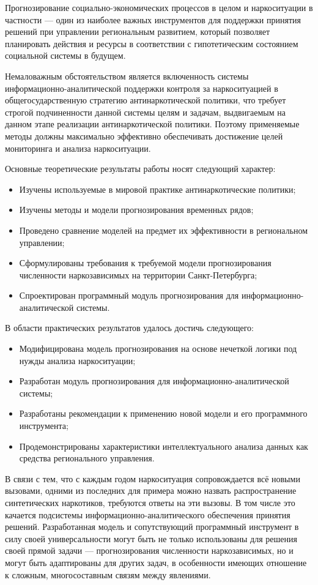 Прогнозирование социально-экономических процессов в целом и наркоситуации в
частности --- один из наиболее важных инструментов для поддержки принятия
решений при управлении региональным развитием, который позволяет планировать
действия и ресурсы  в соответствии с гипотетическим состоянием социальной
системы в будущем.

Немаловажным обстоятельством является включенность системы
информационно-аналитической поддержки контроля за наркоситуацией в
общегосударственную стратегию антинаркотической политики, что требует строгой
подчиненности данной системы целям и задачам, выдвигаемым на данном этапе
реализации антинаркотической политики. Поэтому применяемые методы должны
максимально эффективно обеспечивать достижение целей мониторинга и анализа
наркоситуации.

Основные теоретические результаты работы носят следующий характер: 
\begin{itemize}
\item Изучены используемые в мировой практике антинаркотические политики;
\item Изучены методы и модели прогнозирования временных рядов;
\item Проведено сравнение моделей на предмет их эффективности в региональном
управлении;
\item Сформулированы требования к требуемой модели прогнозирования численности
наркозависимых на территории Санкт-Петербурга;
\item Спроектирован программный модуль прогнозирования для
информационно-аналитической системы.
\end{itemize}

В области практических результатов удалось достичь следующего:
\begin{itemize}
\item Модифицирована модель прогнозирования на основе нечеткой логики под нужды
анализа наркоситуации;
\item Разработан модуль прогнозирования для информационно-аналитической системы;
\item Разработаны рекомендации к применению новой модели и 
его программного инструмента;
\item Продемонстрированы характеристики интеллектуального анализа данных как
средства регионального управления.
\end{itemize}

В связи с тем, что с каждым годом наркоситуация сопровождается всё новыми
вызовами, одними из последних для примера можно назвать распространение
синтетических наркотиков, требуются ответы на эти вызовы. В том числе это
качается подсистемы информационно-аналитического обеспечения принятия решений.
Разработанная модель и сопутствующий  программный инструмент в силу своей
универсальности могут быть не только использованы для решения своей прямой
задачи --- прогнозирования численности наркозависимых, но и могут быть
адаптированы для других задач, в особенности имеющих отношение к сложным,
многосоставным связям между явлениями.

